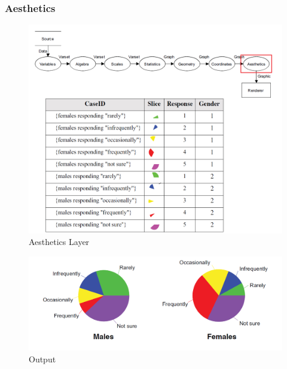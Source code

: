 \documentclass[12pt]{article}
\begin{document}
\subsubsection{Aesthetics}
\begin{figure}[h!]
\caption{Aesthetics Layer}
\includegraphics[width=\textwidth]{pic/pre7}
\end{figure}
\begin{figure}[h!]
\caption{Output}
\includegraphics[width=\textwidth]{pic/pre8}
\end{figure}

\newpage
\end{document}
